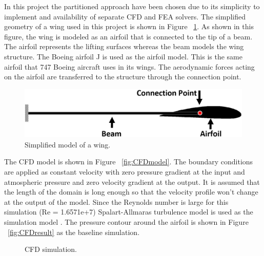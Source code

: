 \documentclass[paper=a4, fontsize=12pt]{scrartcl} %
\begin{document}
In this project the partitioned approach have been chosen due to its simplicity to implement and availability of separate CFD and FEA solvers. The simplified geometry of a wing used in this project is shown in Figure ~\ref{fig:model_geometery}. As shown in this figure, the wing is modeled as an airfoil that is connected to the tip of a beam. The airfoil represents the lifting surfaces whereas the beam models the wing structure. The Boeing airfoil J is used as the airfoil model. This is the same airfoil that 747 Boeing aircraft uses in its wings. The aerodynamic forces acting on the airfoil are transferred to the structure through the connection point.\\
%
\begin{figure}[H]
	\centering
	\includegraphics[height=2.5cm]{model_geometery.jpg}
	\caption{Simplified model of a wing.}
	\label{fig:model_geometery}
\end{figure}
%
The CFD model is shown in Figure ~\ref{fig:CFDmodel}. The boundary conditions are applied as constant velocity with zero pressure gradient at the input and atmospheric pressure and zero velocity gradient at the output. It is assumed that the length of the domain is long enough so that the velocity profile won't change at the output of the model. Since the Reynolds number is large for this simulation (Re = 1.6571e+7) Spalart-Allmaras turbulence model is used as the simulation model \cite{spalart1997comments}. The pressure contour around the airfoil is shown in Figure ~\ref{fig:CFDresult} as the baseline simulation.\\
%
	\begin{figure}[H]
		\centering
		\quad
		\caption{CFD simulation.}
		\label{fig:random_variables_pdf}
	\end{figure}
\end{document}

